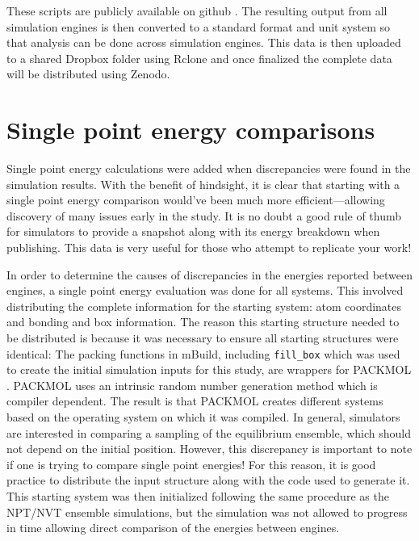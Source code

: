 These scripts are publicly available on github \citep{reproducibility}.
The resulting output from all simulation engines is then converted to a standard format and unit system so that analysis can be done across simulation engines.
This data is then uploaded to a shared Dropbox folder using Rclone and once finalized the complete data will be distributed using Zenodo.

\section{Single point energy comparisons}

Single point energy calculations were added when discrepancies were found in the simulation results. 
With the benefit of hindsight, it is clear that starting with a single point energy comparison would've been much more efficient---allowing discovery of many issues early in the study. 
It is no doubt a good rule of thumb for simulators to provide a snapshot along with its energy breakdown when publishing. 
This data is very useful for those who attempt to replicate your work!

In order to determine the causes of discrepancies in the energies reported between engines, a single point energy evaluation was done for all systems. 
This involved distributing the complete information for the starting system: atom coordinates and bonding and box information. 
The reason this starting structure needed to be distributed is because it was necessary to ensure all starting structures were identical:
The packing functions in mBuild, including \lstinline{fill_box} which was used to create the initial simulation inputs for this study, are wrappers for PACKMOL \citep{Martinez2003, Martinez2009}.
PACKMOL uses an intrinsic random number generation method which is compiler dependent. 
The result is that PACKMOL creates different systems based on the operating system on which it was compiled.
In general, simulators are interested in comparing a sampling of the equilibrium ensemble, which should not depend on the initial position.
However, this discrepancy is important to note if one is trying to compare single point energies!
For this reason, it is good practice to distribute the input structure along with the code used to generate it.
This starting system was then initialized following the same procedure as the NPT/NVT ensemble simulations, but the simulation was not allowed to progress in time allowing direct comparison of the energies between engines.

